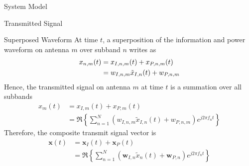 \documentclass{IEEEtran}
\begin{document}
\begin{section} {System Model}
\begin{subsection}	{Transmitted Signal}
		\begin{subsubsection} {Superposed Waveform}
			At time $t$, a superposition of the information and power waveform on antenna $m$ over subband $n$ writes as
			\begin{equation}	\label{eq:x_{n,m}(t)}
				\begin{split}
					x_{n,m}(t)
					&= x_{I,n,m}(t)+x_{P,n,m}(t)	\\
					&= w_{I,n,m} \tilde{x}_{I,n}(t)+w_{P,n,m}
				\end{split}
			\end{equation}
			Hence, the transmitted signal on antenna $m$ at time $t$ is a summation over all subbands
			\begin{equation}	\label{eq:x_m(t)}
				\begin{split}
					x_m(t)
					&= x_{I,m}(t)+x_{P,m}(t)	\\
					&= \Re \left\{ \sum_{n=1}^{N} (w_{I,n,m} \tilde{x}_{I,n}(t)+w_{P,n,m}) e^{j2 \pi f_n t} \right\}
				\end{split}
			\end{equation}
			Therefore, the composite transmit signal vector is
			\begin{equation}	\label{x(t)}
				\begin{split}
					\boldsymbol{x}(t)
					&=\boldsymbol{x}_I(t)+\boldsymbol{x}_P(t)	\\
					&=\Re \left\{ \sum_{n=1}^{N} (\boldsymbol{w}_{I,n}\tilde{x}_n(t)+\boldsymbol{w}_{P,n}) e^{j2{\pi}{f_n}t} \right\}
				\end{split}
			\end{equation}
		\end{subsubsection}

	\end{subsection}


\end{section}
\end{document}
